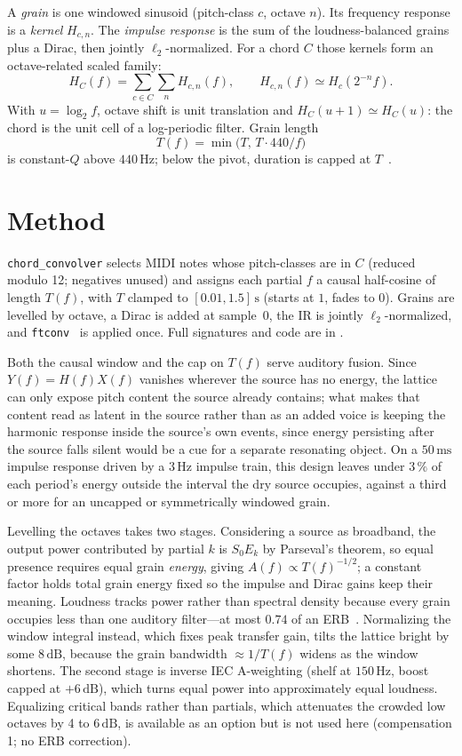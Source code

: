 \documentclass[runningheads,a4paper]{llncs}
\begin{document}
A \emph{grain} is one windowed sinusoid (pitch-class $c$, octave $n$). Its
frequency response is a \emph{kernel} $H_{c,n}$. The \emph{impulse response}
is the sum of the loudness-balanced grains plus a Dirac, then jointly
$\ell_2$-normalized. For a chord $C$ those kernels form an octave-related
scaled family:
\[
H_C(f)=\sum_{c\in C}\sum_n H_{c,n}(f),\qquad
H_{c,n}(f)\simeq H_c(2^{-n}f).
\]
With $u=\log_2 f$, octave shift is unit translation and
$H_C(u+1)\simeq H_C(u)$: the chord is the unit cell of a log-periodic filter.
Grain length
\[
T(f)=\min\bigl(T,\,T\cdot 440/f\bigr)
\]
is constant-$Q$ above $440\,\mathrm{Hz}$; below the pivot, duration is capped
at $T$~\cite{gabor1946theory}.

\section{Method}

\texttt{chord\_convolver} selects MIDI notes whose pitch-classes are
in $C$ (reduced modulo 12; negatives unused) and assigns each partial $f$ a
causal half-cosine of length $T(f)$, with $T$ clamped to
$[0.01,1.5]\,\mathrm{s}$ (starts at $1$, fades to $0$). Grains are levelled by octave, a
Dirac is added at sample~$0$, the IR is jointly $\ell_2$-normalized, and
\texttt{ftconv}~\cite{csoundmanualftconv} is applied once. Full signatures and
code are in \submissionmaterialsrepocite.

Both the causal window and the cap on $T(f)$ serve auditory fusion. Since
$Y(f)=H(f)X(f)$ vanishes wherever the source has no energy, the lattice can only
expose pitch content the source already contains; what makes that content read
as latent in the source rather than as an added voice is keeping the harmonic
response inside the source's own events, since energy persisting after the
source falls silent would be a cue for a separate resonating object. On a
$50\,\mathrm{ms}$ impulse response driven by a $3\,\mathrm{Hz}$ impulse train,
this design leaves under $3\,\%$ of each period's energy outside the interval
the dry source occupies, against a third or more for an uncapped or
symmetrically windowed grain.

Levelling the octaves takes two stages. Considering a source as broadband, the
output power contributed by partial $k$ is $S_0 E_k$ by Parseval's theorem, so
equal presence requires equal grain \emph{energy}, giving
$A(f)\propto T(f)^{-1/2}$; a constant factor holds total grain energy fixed so
the impulse and Dirac gains keep their meaning. Loudness tracks power rather
than spectral density because every grain occupies less than one auditory
filter---at most $0.74$ of an ERB~\cite{glasberg1990derivation}. Normalizing the
window integral instead, which fixes peak transfer gain, tilts the lattice
bright by some $8\,\mathrm{dB}$, because the grain bandwidth $\approx 1/T(f)$
widens as the window shortens. The second stage is inverse IEC A-weighting
(shelf at $150\,\mathrm{Hz}$, boost capped at $+6\,\mathrm{dB}$), which turns
equal power into approximately equal loudness. Equalizing critical bands rather than
partials, which attenuates the crowded low octaves by 4 to $6\,\mathrm{dB}$, is
available as an option but is not used here (compensation 1; no ERB
correction).
\end{document}
